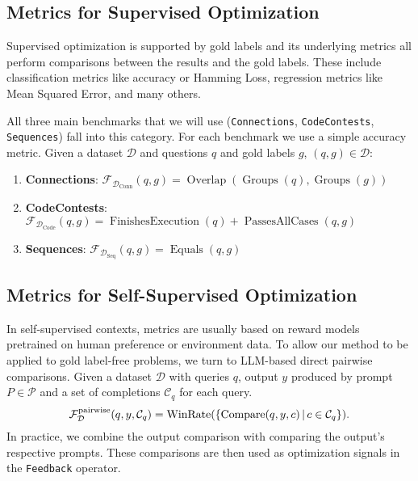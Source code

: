 \subsection{Metrics for Supervised Optimization}
Supervised optimization is supported by gold labels and its underlying metrics all perform comparisons between the results and the gold labels.
These include classification metrics like accuracy or Hamming Loss, regression metrics like Mean Squared Error, and many others.

All three main benchmarks that we will use (\texttt{Connections}, \texttt{CodeContests}, \texttt{Sequences}) 
fall into this category. For each benchmark we use a simple accuracy metric. Given a dataset $\mathcal{D}$ and questions $q$ and gold labels $g$, $(q,g) \in \mathcal{D}$:
\begin{enumerate}
    \item \textbf{Connections}:  $\mathcal{F}_{\mathcal{D}_{\text{Conn}}}(q, g) = \operatorname{Overlap}(\operatorname{Groups}(q), \operatorname{Groups}(g))$
    \item \textbf{CodeContests}: $\mathcal{F}_{\mathcal{D}_{\text{Code}}}(q, g) = \operatorname{FinishesExecution}(q) + \operatorname{PassesAllCases}(q, g)$
    \item \textbf{Sequences}: $\mathcal{F}_{\mathcal{D}_{\text{Seq}}}(q, g) = \operatorname{Equals}(q, g)$
\end{enumerate} 

\subsection{Metrics for Self-Supervised Optimization}\label{sec:ssometrics}
In self-supervised contexts, metrics are usually based on reward models pretrained on human preference or environment data.
To allow our method to be applied to gold label-free problems, we turn to LLM-based direct pairwise comparisons.
Given a dataset $\mathcal{D}$ with queries $q$, output $y$ produced by prompt $P \in \mathscr{P}$ and a set of completions $\mathcal{C}_{q}$ for each query.
\begin{equation}
    \mathcal{F}_{\mathcal{D}}^{\text{pairwise}}(q, y, \mathcal{C}_{q}) = \operatorname{WinRate}(\{\operatorname{Compare}(q,y,c)\, \vert \, c\in \mathcal{C}_{q}\}).
\end{equation}
In practice, we combine the output comparison with comparing the output's respective prompts.
These comparisons are then used as optimization signals in the \texttt{Feedback} operator.

